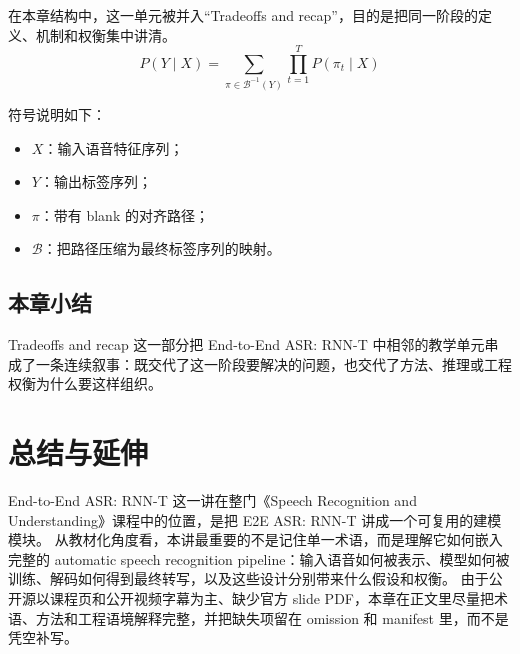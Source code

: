 \documentclass[a4paper]{article}
\begin{document}
在本章结构中，这一单元被并入“Tradeoffs and recap”，目的是把同一阶段的定义、机制和权衡集中讲清。
\[
P(Y \mid X) = \sum_{\pi \in \mathcal{B}^{-1}(Y)} \prod_{t=1}^{T} P(\pi_t \mid X)
\]

符号说明如下：
\begin{itemize}
\item $X$：输入语音特征序列；
\item $Y$：输出标签序列；
\item $\pi$：带有 blank 的对齐路径；
\item $\mathcal{B}$：把路径压缩为最终标签序列的映射。
\end{itemize}

\subsection{本章小结}
Tradeoffs and recap 这一部分把 End-to-End ASR: RNN-T 中相邻的教学单元串成了一条连续叙事：既交代了这一阶段要解决的问题，也交代了方法、推理或工程权衡为什么要这样组织。

\section{总结与延伸}
End-to-End ASR: RNN-T 这一讲在整门《Speech Recognition and Understanding》课程中的位置，是把 E2E ASR: RNN-T 讲成一个可复用的建模模块。
从教材化角度看，本讲最重要的不是记住单一术语，而是理解它如何嵌入完整的 automatic speech recognition pipeline：输入语音如何被表示、模型如何被训练、解码如何得到最终转写，以及这些设计分别带来什么假设和权衡。
由于公开源以课程页和公开视频字幕为主、缺少官方 slide PDF，本章在正文里尽量把术语、方法和工程语境解释完整，并把缺失项留在 omission 和 manifest 里，而不是凭空补写。
\end{document}
